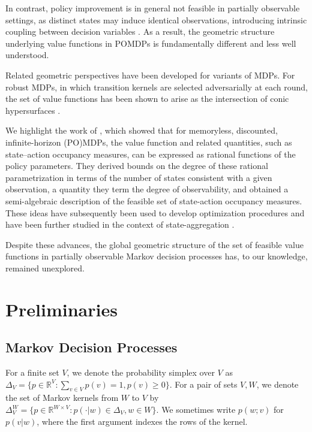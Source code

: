 \documentclass{article}
\theoremstyle{definition}
\theoremstyle{remark}
\begin{document}
In contrast, policy improvement is in general not feasible in partially observable settings, as distinct states may induce identical observations, introducing intrinsic coupling between decision variables \citep{liFindingOptimalMemoryless2011}. As a result, the geometric structure underlying value functions in POMDPs is fundamentally different and less well understood. 

Related geometric perspectives have been developed for variants of MDPs. For robust MDPs, in which transition kernels are selected adversarially at each round, the set of value functions has been shown to arise as the intersection of conic hypersurfaces \citep{wangGeometryRobustValue2022}. 

We highlight the work of  \citet{mullerGeometryMemorylessStochastic2022}, which showed that for memoryless, discounted, infinite-horizon (PO)MDPs, the value function and related quantities, such as state–action occupancy measures, can be expressed as rational functions of the policy parameters. They derived bounds on the  degree of these rational parametrization in terms of the number of states consistent with a given observation, a quantity they term the degree of observability, and obtained a semi-algebraic description of the feasible set of state-action occupancy measures. These ideas have subsequently been used to develop optimization procedures \citep{mueller2022solving} and have been further studied in the context of state-aggregation \citep{DRESSLER2024102241}. 

Despite these advances, the global geometric structure of the set of feasible value functions in partially observable Markov decision processes has, to our knowledge, remained unexplored. 
    
\section{Preliminaries}
\label{sec:prelims}

\subsection{Markov Decision Processes}  

For a finite set $V$, we denote the probability simplex over $V$ as $\Delta_V=\{p\in\mathbb{R}^V\colon \sum_{v\in V}p(v)=1, p(v)\geq 0\}$. 
For a pair of sets $V, W$, we denote the set of Markov kernels from $W$ to $V$ by $\Delta_V^W =\{ p \in\mathbb{R}^{W\times V}\colon p(\cdot|w) \in\Delta_V, w\in W \}$. 
%
We sometimes write $p(w;v)$ for $p(v|w)$, where the first argument indexes the rows of the kernel. 
\end{document}
